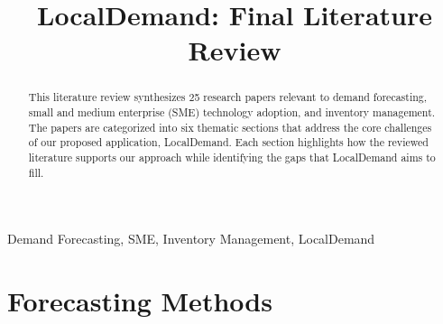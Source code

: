 \documentclass[conference]{IEEEtran}
\begin{document}
\title{LocalDemand: Final Literature Review}

\author{
}

\maketitle

\begin{abstract}
This literature review synthesizes 25 research papers relevant to demand forecasting, small and medium enterprise (SME) technology adoption, and inventory management. The papers are categorized into six thematic sections that address the core challenges of our proposed application, LocalDemand. Each section highlights how the reviewed literature supports our approach while identifying the gaps that LocalDemand aims to fill.
\end{abstract}

\begin{IEEEkeywords}
Demand Forecasting, SME, Inventory Management, LocalDemand
\end{IEEEkeywords}

\section{Forecasting Methods}
\end{document}
